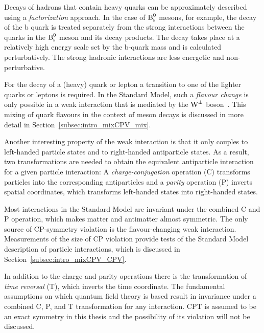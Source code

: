Decays of hadrons that contain heavy quarks can be approximately described using a \emph{factorization} approach. In the case of $\Bs$
mesons, for example, the decay of the b quark is treated separately from the strong interactions between the quarks in the $\Bs$ meson and
its decay products. The decay takes place at a relatively high energy scale set by the b-quark mass and is calculated perturbatively. The
strong hadronic interactions are less energetic and non-perturbative.

For the decay of a (heavy) quark or lepton a transition to one of the lighter quarks or leptons is required. In the Standard Model, such a
\emph{flavour change} is only possible in a weak interaction that is mediated by the $\Wpm$
boson~\cite{Cabibbo:1963yz,Glashow:1970gm,Kobayashi:1973fv}. This mixing of quark flavours in the context of meson decays is discussed in
more detail in Section~\ref{subsec:intro_mixCPV_mix}.


Another interesting property of the weak interaction is that it only couples to left-handed particle states and to right-handed
antiparticle states. As a result, two transformations are needed to obtain the equivalent antiparticle interaction for a given particle
interaction: A \emph{charge-conjugation} operation (C) transforms particles into the corresponding antiparticles and a \emph{parity}
operation (P) inverts spatial coordinates, which transforms left-handed states into right-handed states.

Most interactions in the Standard Model are invariant under the combined C and P operation, which makes matter and antimatter almost
symmetric. The only source of CP-symmetry violation is the flavour-changing weak interaction. Measurements of the size of CP violation
provide tests of the Standard Model description of particle interactions, which is discussed in Section~\ref{subsec:intro_mixCPV_CPV}.

In addition to the charge and parity operations there is the transformation of \emph{time reversal} (T), which inverts the time coordinate.
The fundamental assumptions on which quantum field theory is based result in invariance under a combined C, P, and T transformation for any
interaction. CPT is assumed to be an exact symmetry in this thesis and the possibility of its violation will not be discussed.


